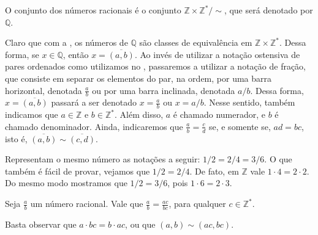 \documentclass[../main.tex]{subfiles}
\begin{document}
\begin{defi}\label{rac-def-conjuntoQ}
   O conjunto dos números racionais é o conjunto $\mathbb{Z} \times \mathbb{Z}^* / \sim$, que será denotado por $\mathbb{Q}$.
\end{defi}
Claro que com a , os números de $\mathbb{Q}$ são classes de equivalência em $\mathbb{Z} \times \mathbb{Z}^*$.
Dessa forma, se $x \in \mathbb{Q}$, então $x = \overline{(a,b)}$. Ao invés de utilizar a notação ostensiva de pares ordenados como utilizamos no , passaremos a utilizar a notação de fração, que consiste em separar os elementos do par, na ordem, por uma barra horizontal, denotada $\frac{a}{b}$ ou por uma barra inclinada, denotada $a/b$. Dessa forma, $x = \overline{(a,b)}$ passará a ser denotado $x = \frac{a}{b}$ ou $x = a/b$. Nesse sentido, também indicamos que $a \in \mathbb{Z}$ e $b \in \mathbb{Z}^*$. Além disso, $a$ é chamado numerador, e $b$ é chamado denominador. Ainda, indicaremos que $\frac{a}{b} = \frac{c}{d}$ se, e somente se, $ad = bc$, isto é, $\overline{(a,b)} \sim \overline{(c,d)}$.

\begin{ex}
    Representam o mesmo número as notações a seguir: $1/2 =  2/4 = 3/6$. O que também é fácil de provar, vejamos que $1/2 =  2/4$. De fato, em $\mathbb{Z}$ vale $1 \cdot 4 = 2 \cdot 2$. Do mesmo modo mostramos que $1/2 = 3/6$, pois $1 \cdot 6 = 2 \cdot 3$.
\end{ex}

\begin{prop}\label{rac-prop-cancelarFatorComumNumeradorDenominador}
    Seja $\frac{a}{b}$ um número racional. Vale que $ \frac{a}{b} = \frac{ac}{bc}$, para qualquer $c \in \mathbb{Z}^*$.
\end{prop}
\begin{dem}
    Basta observar que $a \cdot bc = b \cdot ac$, ou que $(a,b) \sim (ac,bc)$.
\end{dem}

\end{document}
